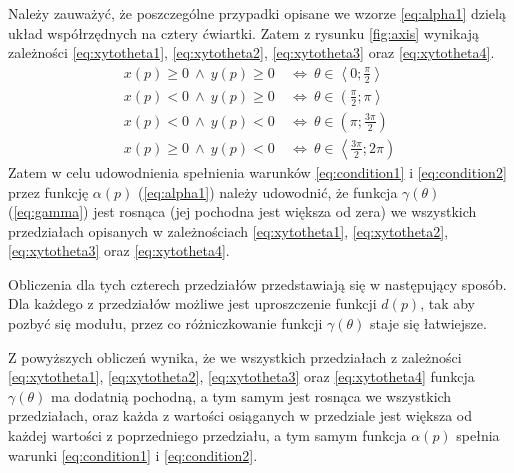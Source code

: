      Należy zauważyć, że poszczególne przypadki opisane we wzorze \ref{eq:alpha1} dzielą układ współrzędnych na cztery ćwiartki. Zatem z rysunku \ref{fig:axis} wynikają zależności
     \ref{eq:xytotheta1}, 
     \ref{eq:xytotheta2}, 
     \ref{eq:xytotheta3} oraz
     \ref{eq:xytotheta4}.
     \begin{align}\label{eq:xytotheta1}
    		x\left(p\right) \geqslant 0 \ \wedge \  y\left(p\right) \geqslant 0  \ & \Leftrightarrow \ \theta \in \left\langle 0;\frac{\pi}{2}\right\rangle \\
    		\label{eq:xytotheta2}
    		x\left(p\right) < 0 \ \wedge \ y\left(p\right) \geqslant 0 \ & \Leftrightarrow \
  		\theta \in \left( \frac{\pi}{2};\pi\right\rangle\\
  		\label{eq:xytotheta3}
    		x\left(p\right) < 0 \ \wedge \ y\left(p\right) < 0 \ & \Leftrightarrow \
  		\theta \in \left( \pi;\frac{3\pi}{2}\right)\\
  		\label{eq:xytotheta4}
  		x\left(p\right) \geqslant 0 \ \wedge \ y\left(p\right) < 0 \ & \Leftrightarrow \
  	\theta \in \left\langle
  		\frac{
  			3\pi
  		}{
  			2
  		};
  		2\pi
  	\right)
    \end{align}
    Zatem w celu udowodnienia spełnienia warunków \ref{eq:condition1} i \ref{eq:condition2} przez funkcję $\alpha\left(p\right)$ (\ref{eq:alpha1}) należy udowodnić, że funkcja $\gamma\left(\theta\right)$ (\ref{eq:gamma}) jest rosnąca (jej pochodna jest większa od zera) we wszystkich przedziałach opisanych w zależnościach
     \ref{eq:xytotheta1}, 
     \ref{eq:xytotheta2}, 
     \ref{eq:xytotheta3} oraz
     \ref{eq:xytotheta4}.
    
    Obliczenia dla tych czterech przedziałów przedstawiają się w następujący sposób. Dla każdego z przedziałów możliwe jest uproszczenie funkcji $d\left(p\right)$, tak aby pozbyć się modułu, przez co różniczkowanie funkcji $\gamma\left(\theta\right)$ staje się łatwiejsze.
 
    
    
    Z powyższych obliczeń wynika, że we wszystkich przedziałach z zależności
    \ref{eq:xytotheta1}, 
     \ref{eq:xytotheta2}, 
     \ref{eq:xytotheta3} oraz
     \ref{eq:xytotheta4} funkcja $\gamma\left(\theta\right)$ ma dodatnią pochodną, a tym samym jest rosnąca we wszystkich przedziałach, oraz każda z wartości osiąganych w przedziale jest większa od każdej wartości z poprzedniego przedziału, a tym samym funkcja $\alpha\left(p\right)$ spełnia warunki \ref{eq:condition1} i \ref{eq:condition2}.
     
